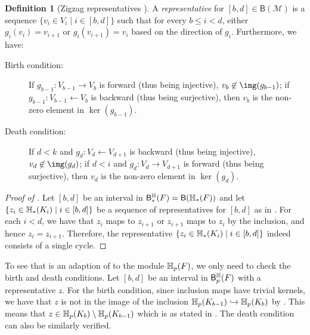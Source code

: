 \documentclass[10pt,a4paper]{amsart}
\newcommand {\mm}[1] {\ifmmode{#1}\else{\mbox{\(#1\)}}\fi}
\newcommand{\har}           {\mm{\mathbb{H}}}
\theoremstyle{definition}
\newcommand{\Mcal}{\mathcal{M}}
\newcommand{\barc}{\mathsf{B}}
\newcommand{\filt}{F}
\newcommand{\fsimp}{\sigma}
\newcommand{\incto}{\hookrightarrow}
\newcommand{\hbarc}{\mathsf{B}^\har}
\newtheorem{definition}[theorem]{Definition}
\theoremstyle{remark}
\begin{document}
\begin{definition}[Zigzag representatives \cite{maria2015zigzag}]
\label{dfn:rep-cls-ori}
A \emph{representative} for $[b,d]\in\barc(\Mcal)$
is a sequence $\{v_i\in V_i\mid i\in[b,d]\}$
such that  for every $b\leq i<d$, 
either $g_i(v_i)=v_{i+1}$ or
$g_i(v_{i+1})=v_{i}$
based on the direction of $g_i$.
Furthermore, we have:
\begin{description}
    \item[Birth condition:] 
    If $g_{b-1}:V_{b-1}\to V_{b}$ is forward
    (thus being injective),
    $v_b\not\in\img(g_{b-1})$;
    if $g_{b-1}:V_{b-1}\leftarrow V_{b}$ is backward
    (thus being  surjective),
    then $v_b$ is the non-zero element in $\ker(g_{b-1})$.
    
    \item[Death condition:]
    If $d<k$ and
    $g_{d}:V_{d}\leftarrow V_{d+1}$ is backward
    (thus being injective),
    $v_d\not\in\img(g_{d})$;
    if $d<i$
    and $g_{d}:V_{d}\to V_{d+1}$ is forward
    (thus being surjective),
    then $v_d$ is the non-zero element in $\ker(g_{d})$.
\end{description}
\end{definition}

\begin{proof}[Proof of ]
Let $[b,d]$ be an interval in $\hbarc_*(\filt)=\barc(\har_*(\filt))$
and let $\{z_i\in\har_*(K_i)\mid i\in[b,d]\}$
be a sequence of representatives for $[b,d]$
as in .
For each $i<d$,
we have that $z_i$
maps to $z_{i+1}$ 
or $z_{i+1}$
maps to $z_{i}$ 
by the inclusion,
and hence $z_i=z_{i+1}$.
Therefore, the representative
$\{z_i\in\har_*(K_i)\mid i\in[b,d]\}$ indeed
consists of a single cycle.
\end{proof}

To see that  is an adaption of 
to the module $\har_p(\filt)$, we only need to check the birth
and death conditions.
Let $[b,d]$ be an interval in $\hbarc_p(\filt)$
with a representative $z$.
For the birth condition, since inclusion maps have trivial kernels,
we have that $z$ is not in the image of the inclusion $\har_p(K_{b-1})\incto \har_p(K_b)$
by .
This means that 
$z\in\har_p(K_{b})\setminus\har_p(K_{b-1})$ 
which is as stated in .
The death condition can also be similarly verified.
%
%
\end{document}
